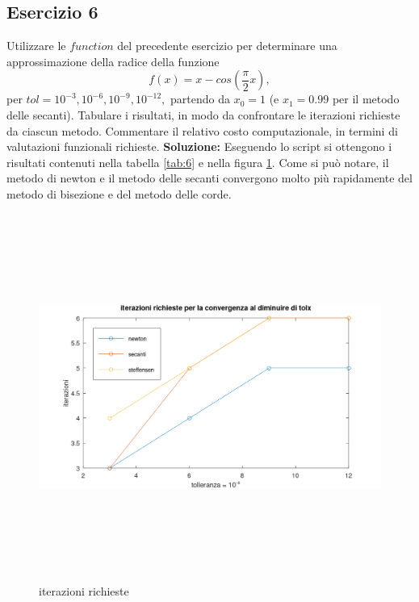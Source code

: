 \subsection{Esercizio 6}
Utilizzare le $function$ del precedente esercizio per determinare una approssimazione
della radice della funzione
\[
        f(x) = x - cos(\frac{\pi}{2}x),
\]
per $tol = 10^{-3}, 10^{-6}, 10^{-9}, 10^{-12},$ partendo da $x_0 = 1$
(e $x_1 = 0.99$ per il metodo delle secanti). Tabulare i risultati,
in modo da confrontare le iterazioni richieste da ciascun metodo. Commentare
il relativo costo computazionale, in termini di valutazioni funzionali richieste.
\newline \textbf{Soluzione:} \newline
Eseguendo lo script si ottengono i risultati contenuti nella tabella \ref{tab:6}
e nella figura \ref{fig:es6}. Come si può notare, il metodo di newton e il metodo delle secanti
convergono molto più rapidamente del metodo di bisezione e del metodo delle corde.
\begin{table}[h]
        \small
        \renewcommand\arraystretch{2}
        \caption{valori approssimati con i metodi di Newton, secanti e Steffensen}
        \label{tab:6}
        \normalsize
\end{table}
\begin{figure}[h!]
        \includegraphics[width=16cm,height=12cm,keepaspectratio]{capitolo2/es6_figure.png}
        \caption{iterazioni richieste}
        \label{fig:es6}
\end{figure}
